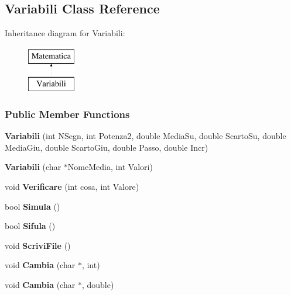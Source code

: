 \hypertarget{classVariabili}{\subsection{\-Variabili \-Class \-Reference}
\label{classVariabili}
}
\-Inheritance diagram for \-Variabili\-:\begin{figure}[H]
\begin{center}
\leavevmode
\includegraphics[height=2.000000cm]{classVariabili}
\end{center}
\end{figure}
\subsubsection*{\-Public \-Member \-Functions}
\begin{DoxyCompactItemize}
\item 
\hypertarget{classVariabili_af881fc3fcaf007a6ad92298c943be1e1}{{\bfseries \-Variabili} (int \-N\-Segn, int \-Potenza2, double \-Media\-Su, double \-Scarto\-Su, double \-Media\-Giu, double \-Scarto\-Giu, double \-Passo, double \-Incr)}\label{classVariabili_af881fc3fcaf007a6ad92298c943be1e1}

\item 
\hypertarget{classVariabili_a7d700d7f563966a19f9016ba03a9ff5c}{{\bfseries \-Variabili} (char $\ast$\-Nome\-Media, int \-Valori)}\label{classVariabili_a7d700d7f563966a19f9016ba03a9ff5c}

\item 
\hypertarget{classVariabili_aee1c6ef09b1a59200ab17589402e5813}{void {\bfseries \-Verificare} (int cosa, int \-Valore)}\label{classVariabili_aee1c6ef09b1a59200ab17589402e5813}

\item 
\hypertarget{classVariabili_a481b4c571a6e13c411f1564d1fa59322}{bool {\bfseries \-Simula} ()}\label{classVariabili_a481b4c571a6e13c411f1564d1fa59322}

\item 
\hypertarget{classVariabili_a0a9d83bb6daab4ecf2b7d88109cbf117}{bool {\bfseries \-Sifula} ()}\label{classVariabili_a0a9d83bb6daab4ecf2b7d88109cbf117}

\item 
\hypertarget{classVariabili_aa49dc238fd7a5356a4ff0f33505fd176}{void {\bfseries \-Scrivi\-File} ()}\label{classVariabili_aa49dc238fd7a5356a4ff0f33505fd176}

\item 
\hypertarget{classVariabili_a8966d84a169a5ae5f2fb4e4dff78d688}{void {\bfseries \-Cambia} (char $\ast$, int)}\label{classVariabili_a8966d84a169a5ae5f2fb4e4dff78d688}

\item 
\hypertarget{classVariabili_a2f097ce8803ddd5d4d36b59e6b8dbb37}{void {\bfseries \-Cambia} (char $\ast$, double)}\label{classVariabili_a2f097ce8803ddd5d4d36b59e6b8dbb37}

\end{DoxyCompactItemize}
